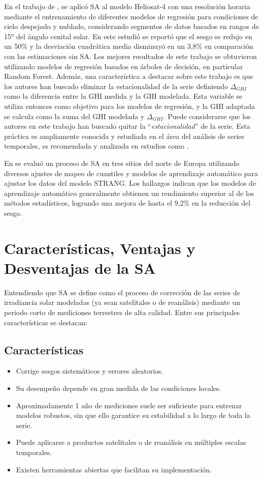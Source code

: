 En el trabajo de \citep{SALAMALIKIS2022}, se aplicó SA al modelo Heliosat-4 con una resolución horaria mediante el entrenamiento de diferentes modelos de regresión para condiciones de cielo despejado y nublado, considerando segmentos de datos basados en rangos de 15° del ángulo cenital solar. En este estudió se reportó  que el sesgo se redujo en un 50\% y la desviación cuadrática media disminuyó en un 3,8\% en comparación con las estimaciones sin SA. Los mejores resultados de este trabajo se obtuvieron utilizando modelos de regresión basados en árboles de decisión, en particular Random Forest. Además, una característica a destacar sobre este trabajo es que los autores han buscado eliminar la estacionalidad de la serie definiendo $\Delta_{GHI}$ como la diferencia entre la GHI medida y la GHI modelada. Esta variable se utiliza entonces como objetivo para los modelos de regresión, y la GHI adaptada se calcula como la suma del GHI modelada y $\Delta_{GHI}$. Puede considerarse que los autores en este trabajo han buscado quitar la \enquote{\textit{estacionalidad}} de la serie. Esta práctica es ampliamente conocida y estudiada en el área del análisis de series temporales, es recomendada y analizada en estudios como \citep{THORNTON2013, Claveria2015}.   


En \citep{ZAINALI2024} se evaluó un proceso de SA en tres sitios del norte de Europa utilizando diversos ajustes de mapeo de cuantiles y modelos de aprendizaje automático para ajustar los datos del modelo STRANG. Los hallazgos indican que los modelos de aprendizaje automático generalmente obtienen un rendimiento superior al de los métodos estadísticos, logrando una mejora de hasta el 9,2\% en la reducción del sesgo.


\section{Características, Ventajas y Desventajas de la SA}

Entendiendo que SA se define como el proceso de corrección de las series de irradiancia solar modeladas (ya sean satelitales o de reanálisis) mediante un periodo corto de mediciones terrestres de alta calidad. Entre sus principales características se destacan:


\subsection{Características}


\begin{itemize}
\item Corrige sesgos sistemáticos y errores aleatorios.
\item Su desempeño depende en gran medida de las condiciones locales.
\item  Aproximadamente 1 año de mediciones suele ser suficiente para entrenar modelos robustos, sin que ello garantice su estabilidad a lo largo de toda la serie.
\item Puede aplicarse a productos satelitales o de reanálisis en múltiples escalas temporales.
\item Existen herramientas abiertas que facilitan su implementación.
\end{itemize}



